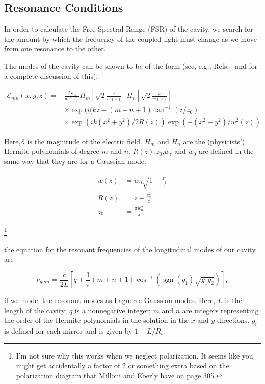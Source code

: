 \subsection{Resonance Conditions}
In order to calculate the Free Spectral Range (FSR) of the cavity, we search for the amount by which the frequency of the coupled light must change as we move from one resonance to the other. 

The modes of the cavity can be shown to be of the form (see, e.g., Refs.\ \cite{lasersMilonniEberly} and \cite{bergeson_amo_notes} for a complete discussion of this):

\begin{align}
\mathcal{E}_{mn}(x,y,z)=&\frac{Aw_o}{w(z)}H_m\left[\sqrt{2}\frac{x}{w(z)}\right]H_n\left[\sqrt{2}\frac{x}{w(z)}\right] \\
&\times \exp(i(kz-(m+n+1)\tan^{-1}(z/z_0)\\
&\times \exp(ik(x^2+y^2)/2R(z)) \exp(-(x^2+y^2)/w^2(z))
\end{align}

Here,$\mathcal{E}$ is the magnitude of the electric field. $H_m$ and $H_n$ are the (physicists') Hermite polynomials of degree $m$ and $n$. $R(z)$,$z_0$,$w_z$ and $w_0$ are defined in the same way that they are for a Gaussian mode:

\begin{align}
w(z)&=w_0 \sqrt{1+\frac{z^2}{z_0^2}} \\
R(z)&=z+\frac{z_0^2}{z}\\
z_0&=\frac{\pi w_0^2}{\lambda }
\end{align}

\footnote{I'm not sure why this works when we neglect polarization. It seems like you might get accidentally a factor of 2 or something extra based on the polarization diagram that Milloni and Eberly have on page 305. }


the equation for the resonant frequencies of the longitudinal modes of our cavity are

\begin{equation} \label{eqModeF}
\nu_{qmn}=\frac{c}{2L}\left[q + \frac{1}{\pi}(m+n+1)\cos^{-1}(\operatorname{sgn}(g_1)\sqrt{g_1 g_2})\right], 
\end{equation}

if we model the resonant modes as Laguerre-Gaussian modes. Here, $L$ is the length of the cavity; $q$ is a nonnegative integer; $m$ and $n$ are integers representing the order of the Hermite polynomials in the solution in the $x$ and $y$ directions. $g_i$ is defined for each mirror and is given by $1-L/R_i$.


